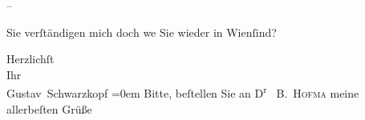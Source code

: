 \pstart
           \numberlinefalse{}–\numberlinetrue{}\pend
           
\pstart
           Sie verſtändigen mich doch we{\geminationn} Sie wieder in Wienſind?\pend
           
\pstart
           Herzlichſt{\\[\baselineskip]}Ihr{\\[\baselineskip]}\spacefill\mbox{Gustav Schwarzkopf}\pend
           \leftskip=0em{}
\pstart
           \noindent{}Bitte, beſtellen Sie an D\textsuperscript{r}{ } \textsc{B. Hofma{\geminationn}} meine allerbeſten Grüße\pend
           \endnumbering{}
\begin{anhang}
\end{anhang}\newcommand{\dateiname}{L04281}\newcommand{\titel}{Gustav Schwarzkopf an Arthur Schnitzler, 8. 7. 1893}\newcommand{\editorInnen}{Herausgegeben von Jahnke, SelmaMüller, Martin Anton}
